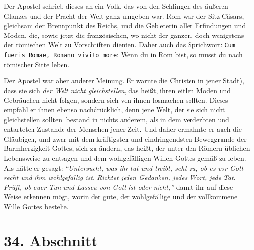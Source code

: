 \medskip

Der Apostel schrieb dieses an ein Volk, das von den Schlingen des äußeren
Glanzes
und der Pracht der Welt ganz umgeben war. Rom war der Sitz
Cäsars, gleichsam
der Brennpunkt des Reichs, und die Gebieterin aller Erfindungen und Moden, die,
sowie jetzt die französischen, wo nicht der ganzen, doch wenigstens der
römischen Welt zu Vorschriften dienten. Daher auch das Sprichwort: \texttt{Cum
fueris Romae, Romano vivito more}: Wenn du in Rom bist, so
musst
du nach römischer Sitte leben.

\medskip

Der Apostel war aber anderer Meinung. Er warnte
die Christen in jener
Stadt), dass sie sich \textit{der Welt nicht gleichstellen}, das heißt, ihren
eitlen
Moden
und Gebräuchen nicht folgen, sondern sich von ihnen losmachen sollten.
Dieses empfahl er ihnen ebenso nachdrücklich, denn jene Welt, der sie sich
nicht gleichstellen sollten, bestand in nichts anderem, als in dem verderbten
und
entarteten Zustande der Menschen jener Zeit. Und daher ermahnte er auch die
Gläubigen, und zwar mit dem kräftigsten und eindringendsten Beweggrunde der
Barmherzigkeit Gottes, sich zu ändern, das heißt, der unter den Römern üblichen
Lebensweise zu entsagen und dem wohlgefälligen Willen Gottes gemäß zu leben.
Als hätte er gesagt:
\textit{"`Untersucht, was ihr tut und treibt, seht zu, ob es vor
Gott recht und ihm wohlgefällig ist. Richtet jeden Gedanken, jedes Wort, jede
Tat. Prüft, ob euer Tun und Lassen von Gott ist oder nicht,"'}
damit ihr auf diese Weise erkennen mögt, worin der gute, der
wohlgefällige und der vollkommene Wille Gottes bestehe.

\section{34. Abschnitt} \label{kap9_ab34}

